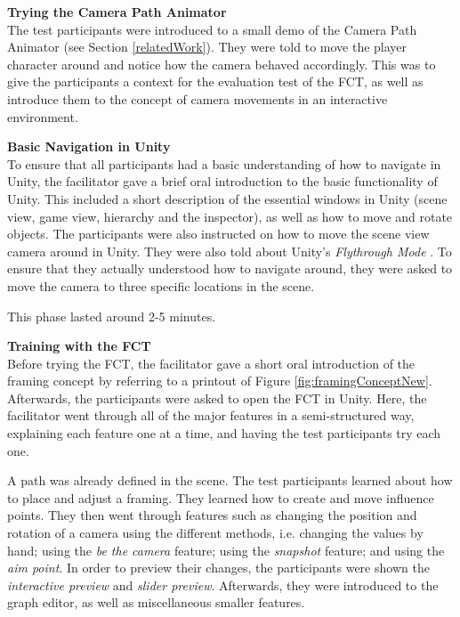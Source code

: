 \textbf{Trying the Camera Path Animator}\\
The test participants were introduced to a small demo of the Camera Path Animator \cite{unity_camTool} (see Section \ref{relatedWork}). They were told to move the player character around and notice how the camera behaved accordingly. This was to give the participants a context for the evaluation test of the FCT, as well as introduce them to the concept of camera movements in an interactive environment.




\textbf{Basic Navigation in Unity}\\
To ensure that all participants had a basic understanding of how to navigate in Unity, the facilitator gave a brief oral introduction to the basic functionality of Unity. This included a short description of the essential windows in Unity (scene view, game view, hierarchy and the inspector), as well as how to move and rotate objects. The participants were also instructed on how to move the scene view camera around in Unity. They were also told about Unity's \textit{Flythrough Mode} \cite{unity_flyMode}. To ensure that they actually understood how to navigate around, they were asked to move the camera to three specific locations in the scene. 


This phase lasted around 2-5 minutes.

\textbf{Training with the FCT}\\
Before trying the FCT, the facilitator gave a short oral introduction of the framing concept by referring to a printout of Figure \ref{fig:framingConceptNew}. Afterwards, the participants were asked to open the FCT in Unity. Here, the facilitator went through all of the major features in a semi-structured way, explaining each feature one at a time, and having the test participants try each one.

A path was already defined in the scene. The test participants learned about how to place and adjust a framing. They learned how to create and move influence points. They then went through features such as changing the position and rotation of a camera using the different methods, i.e. changing the values by hand; using the \textit{be the camera} feature; using the \textit{snapshot} feature; and using the \textit{aim point}. In order to preview their changes, the participants were shown the \textit{interactive preview} and \textit{slider preview}. Afterwards, they were introduced to the graph editor, as well as miscellaneous smaller features.

